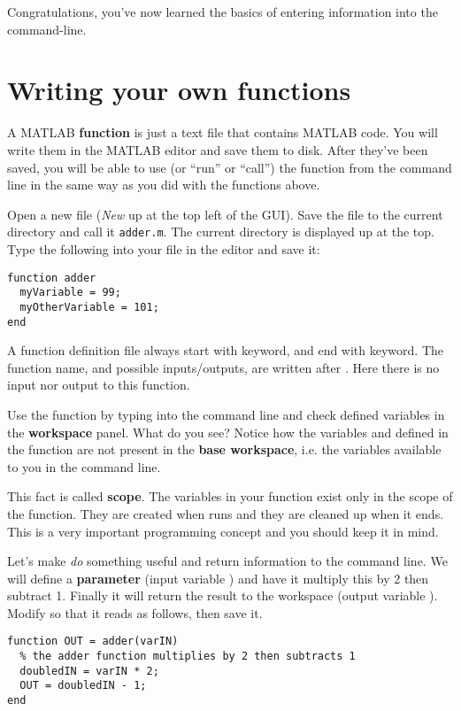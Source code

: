 \documentclass{article}
\begin{document}
Congratulations, you've now learned the basics of entering information into the command-line.

\section{Writing your own functions}

A MATLAB \textbf{function} is just a text file that contains MATLAB code.
You will write them in the MATLAB editor and save them to disk.
After they've been saved, you will be able to use (or ``run'' or ``call'') the function from the command line in the same way as you did with the functions above.

Open a new file (\emph{New} up at the top left of the GUI). 
Save the file to the current directory and call it \verb|adder.m|.
The current directory is displayed up at the top. 
Type the following into your file in the editor and save it:
\begin{lstlisting}
function adder
  myVariable = 99;
  myOtherVariable = 101;
end
\end{lstlisting}
A function definition file always start with  keyword, and end with  keyword.
The function name, and possible inputs/outputs, are written after .
Here there is no input nor output to this function.

Use the function by typing  into the command line and check defined variables in the \textbf{workspace} panel. What do you see?
Notice how the variables  and  defined in the  function are not present in the \textbf{base workspace}, i.e. the variables available to you in the command line.

This fact is called \textbf{scope}.
The variables in your  function exist only in the scope of the  function.
They are created when  runs and they are cleaned up when it ends.
This is a very important programming concept and you should keep it in mind.

Let's make  \emph{do} something useful and return information to the command line.
We will define a \textbf{parameter} (input variable ) and have it multiply this by 2 then subtract 1.
Finally it will return the result to the workspace (output variable ).
Modify  so that it reads as follows, then save it.
\begin{lstlisting}
function OUT = adder(varIN)
  % the adder function multiplies by 2 then subtracts 1
  doubledIN = varIN * 2;
  OUT = doubledIN - 1;
end
\end{lstlisting}
\end{document}
